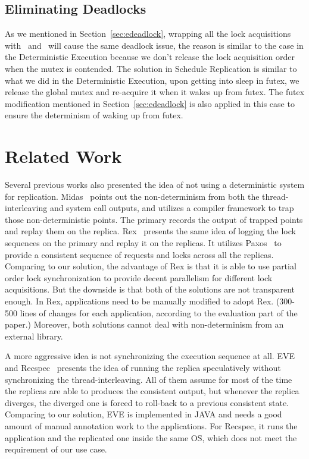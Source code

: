 \subsection{Eliminating Deadlocks} \label{sec:rdeadlock}
As we mentioned in Section~\ref{sec:edeadlock}, wrapping all the lock acquisitions with \detstart\ and \detend\ will cause the same deadlock issue, the reason is similar to the case in the Deterministic Execution because we don't release the lock acquisition order when the mutex is contended. The solution in Schedule Replication is similar to what we did in the Deterministic Execution, upon getting into sleep in futex, we release the global mutex and re-acquire it when it wakes up from futex. The futex modification mentioned in Section~\ref{sec:edeadlock} is also applied in this case to ensure the determinism of waking up from futex.

\section{Related Work}
Several previous works also presented the idea of not using a deterministic system for replication. Midas~\cite{slember2006static} points out the non-determinism from both the thread-interleaving and system call outputs, and utilizes a compiler framework to trap those non-deterministic points. The primary records the output of trapped points and replay them on the replica. Rex~\cite{guo2014rex} presents the same idea of logging the lock sequences on the primary and replay it on the replicas. It utilizes Paxos~\cite{lamport2001paxos} to provide a consistent sequence of requests and locks across all the replicas. Comparing to our solution, the advantage of Rex is that it is able to use partial order lock synchronization to provide decent parallelism for different lock acquisitions. But the downside is that both of the solutions are not transparent enough. In Rex, applications need to be manually modified to adopt Rex. (300-500 lines of changes for each application, according to the evaluation part of the paper.) Moreover, both solutions cannot deal with non-determinism from an external library.

A more aggressive idea is not synchronizing the execution sequence at all. EVE~\cite{kapritsos2012all} and Recspec~\cite{lee2010respec} presents the idea of running the replica speculatively without synchronizing the thread-interleaving. All of them assume for most of the time the replicas are able to produces the consistent output, but whenever the replica diverges, the diverged one is forced to roll-back to a previous consistent state. Comparing to our solution, EVE is implemented in JAVA and needs a good amount of manual annotation work to the applications. For Recspec, it runs the application and the replicated one inside the same OS, which does not meet the requirement of our use case.